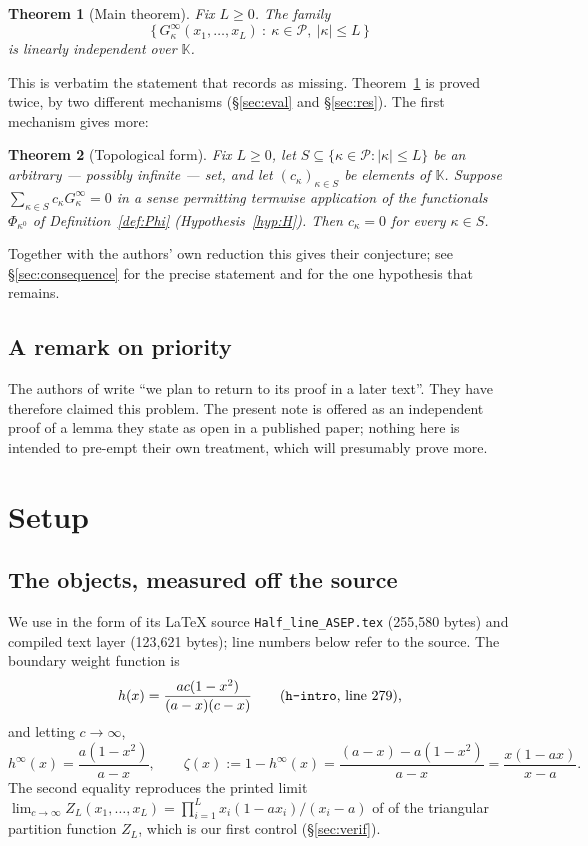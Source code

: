 \documentclass[11pt]{article}
\newtheorem{thm}{Theorem}
\theoremstyle{definition}
\theoremstyle{remark}
\newcommand{\KK}{\mathbb{K}}
\newcommand{\PP}{\mathcal{P}}
\newcommand{\Gi}[1]{G^{\infty}_{#1}}
\begin{document}
\begin{thm}[Main theorem]\label{thm:main}
Fix $L\ge 0$. The family
\[
  \bigl\{\,\Gi{\kappa}(x_1,\dots,x_L)\ :\ \kappa\in\PP,\ |\kappa|\le L\,\bigr\}
\]
is linearly independent over $\KK$.
\end{thm}

This is verbatim the statement that \cite[\S6, after Conjecture \texttt{conj:F-orth}]{GDMW}
records as missing. Theorem~\ref{thm:main} is proved twice, by two different mechanisms
(\S\ref{sec:eval} and \S\ref{sec:res}). The first mechanism gives more:

\begin{thm}[Topological form]\label{thm:top}
Fix $L\ge 0$, let $S\subseteq\{\kappa\in\PP:|\kappa|\le L\}$ be an arbitrary --- possibly
infinite --- set, and let $(c_\kappa)_{\kappa\in S}$ be elements of $\KK$. Suppose
$\sum_{\kappa\in S}c_\kappa \Gi{\kappa}=0$ in a sense permitting termwise application of the
functionals $\Phi_{\kappa^0}$ of Definition~\ref{def:Phi} (Hypothesis~\ref{hyp:H}). Then
$c_\kappa=0$ for every $\kappa\in S$.
\end{thm}

Together with the authors' own reduction this gives their conjecture; see
\S\ref{sec:consequence} for the precise statement and for the one hypothesis that remains.

\subsection{A remark on priority}
The authors of \cite{GDMW} write ``we plan to return to its proof in a later text''. They have
therefore claimed this problem. The present note is offered as an independent proof of a lemma
they state as open in a published paper; nothing here is intended to pre-empt their own
treatment, which will presumably prove more.

\section{Setup}

\subsection{The objects, measured off the source}
We use \cite{GDMW} in the form of its \LaTeX{} source \texttt{Half\_line\_ASEP.tex}
(255{,}580 bytes) and compiled text layer (123{,}621 bytes); line numbers below refer to the
source. The boundary weight function is
\begin{equation}\label{eq:h}
  h(x)=\frac{ac(1-x^2)}{(a-x)(c-x)}
  \qquad\text{(\texttt{h-intro}, line 279),}
\end{equation}
and letting $c\to\infty$,
\begin{equation}\label{eq:hinf}
  h^\infty(x)=\frac{a(1-x^2)}{a-x},
  \qquad
  \zeta(x) := 1-h^\infty(x)=\frac{(a-x)-a(1-x^2)}{a-x}=\frac{x(1-ax)}{x-a}.
\end{equation}
The second equality reproduces the printed limit
$\lim_{c\to\infty}Z_L(x_1,\dots,x_L)=\prod_{i=1}^L x_i(1-ax_i)/(x_i-a)$ of
\cite[line 620]{GDMW} of the triangular partition function $Z_L$, which is our first control
(\S\ref{sec:verif}).
\end{document}
